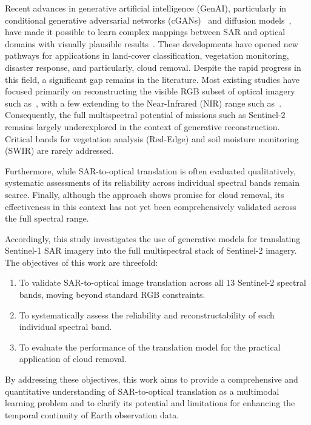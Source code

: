 Recent advances in generative artificial intelligence (GenAI), particularly in conditional generative adversarial networks (cGANs)~\cite{cGANs_mirza} and diffusion models~\cite{DDPM_2020}, have made it possible to learn complex mappings between SAR and optical domains with visually plausible results~\cite{cr_fuse_HR_GEN}. These developments have opened new pathways for applications in land-cover classification, vegetation monitoring, disaster response, and particularly, cloud removal. Despite the rapid progress in this field, a significant gap remains in the literature. Most existing studies have focused primarily on reconstructing the visible RGB subset of optical imagery such as~\cite{CR_RS_GAN_s2o, cr_fuse_HR_GEN, c_diffusion_s2o, hvt_cgan, s2o_color_super_diff}, with a few extending to the Near-Infrared (NIR) range such as~\cite{filmy_cloudy_NIR_Enomoto, Mult_temp_S12_fus}. Consequently, the full multispectral potential of missions such as Sentinel-2 remains largely underexplored in the context of generative reconstruction. Critical bands for vegetation analysis (Red-Edge) and soil moisture monitoring (SWIR) are rarely addressed. 

Furthermore, while SAR-to-optical translation is often evaluated qualitatively, systematic assessments of its reliability across individual spectral bands remain scarce. Finally, although the approach shows promise for cloud removal, its effectiveness in this context has not yet been comprehensively validated across the full spectral range.

Accordingly, this study investigates the use of generative models for translating Sentinel-1 SAR imagery into the full multispectral stack of Sentinel-2 imagery. The objectives of this work are threefold:
\begin{enumerate}
    \item  To validate SAR-to-optical image translation across all 13 Sentinel-2 spectral bands, moving beyond standard RGB constraints.
    \item To systematically assess the reliability and reconstructability of each individual spectral band.
    \item  To evaluate the performance of the translation model for the practical application of cloud removal.
\end{enumerate}
By addressing these objectives, this work aims to provide a comprehensive and quantitative understanding of SAR-to-optical translation as a multimodal learning problem and to clarify its potential and limitations for enhancing the temporal continuity of Earth observation data.